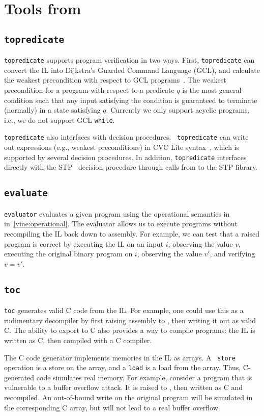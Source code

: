 \section{Tools from \bil}

\subsection{{\tt topredicate}}

{\tt topredicate} supports program verification in two ways. First,
{\tt topredicate} can convert the IL into Dijkstra's Guarded Command
Language (GCL), and calculate the weakest precondition with respect to
GCL programs~\cite{dijkstra:1976}. The weakest precondition for a
program with respect to a predicate $q$ is the most general condition
such that any input satisfying the condition is guaranteed to
terminate (normally) in a state satisfying $q$.  Currently we only
support acyclic programs, i.e., we do not support GCL {\tt while}.

{\tt topredicate} also interfaces with decision procedures.  {\tt
  topredicate} can write out expressions (e.g., weakest preconditions)
in CVC Lite syntax~\cite{cvclite}, which is supported by several
decision procedures. In addition, {\tt topredicate} interfaces
directly with the STP~\cite{ganesh:2007} decision procedure through
calls from \bap to the STP library.



\subsection{{\tt evaluate}} 

{\tt evaluator} evaluates a given \bil
program using the operational semantics in in~\ref{vine:operational}.
The evaluator allows us to execute programs without recompiling the IL
back down to assembly. For example, we can test that a raised program
is correct by executing the IL on an input $i$, observing the value $v$,
executing the original binary program on $i$, observing the value
$v'$, and verifying $v = v'$.

\subsection{{\tt toc}} 

{\tt toc} generates valid C code from the IL.  For example, one could
use this as a rudimentary decompiler by first raising assembly to
\bil, then writing it out as valid C.  The ability to export to C also
provides a way to compile \bil programs: the IL is written as C, then
compiled with a C compiler.

The C code generator implements memories in the IL as arrays.  A {\tt
  store} operation is a store on the array, and a {\tt load} is a load
from the array.  Thus, C-generated code simulates real memory.  For
example, consider a program that is vulnerable to a buffer overflow
attack. It is raised to \bil, then written as C and recompiled. An
out-of-bound write on the original program will be simulated in the
corresponding C array, but will not lead to a real buffer overflow.

